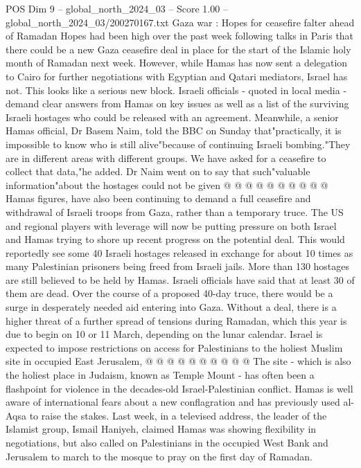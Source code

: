 \begin{textsample}{POS Dim 9 – global\_north\_2024\_03 – Score 1.00 – global\_north\_2024\_03/200270167.txt}  \label{ex:f9_pos_275}
Gaza war : Hopes for ceasefire falter ahead of Ramadan Hopes had been high over the past week following talks in Paris that there could be a new Gaza ceasefire deal in place for the start of the Islamic holy month of Ramadan next week.
However, while Hamas has now sent a delegation to Cairo for further negotiations with Egyptian and Qatari mediators, Israel has not.
This looks like a serious new block.
Israeli officials - quoted in local media - demand clear answers from Hamas on key issues as well as a list of the surviving Israeli hostages who could be released with an agreement.
Meanwhile, a senior Hamas official, Dr Basem Naim, told the BBC on Sunday that"practically, it is impossible to know who is still alive"because of continuing Israeli bombing."They are in different areas with different groups.
We have asked for a ceasefire to collect that data,"he added.
Dr Naim went on to say that such"valuable information"about the hostages could not be given @ @ @ @ @ @ @ @ @ @ Hamas figures, have also been continuing to demand a full ceasefire and withdrawal of Israeli troops from Gaza, rather than a temporary truce.
The US and regional players with leverage will now be putting pressure on both Israel and Hamas trying to shore up recent progress on the potential deal.
This would reportedly see some 40 Israeli hostages released in exchange for about 10 times as many Palestinian prisoners being freed from Israeli jails.
More than 130 hostages are still believed to be held by Hamas.
Israeli officials have said that at least 30 of them are dead.
Over the course of a proposed 40-day truce, there would be a surge in desperately needed aid entering into Gaza.
Without a deal, there is a higher threat of a further spread of tensions during Ramadan, which this year is due to begin on 10 or 11 March, depending on the lunar calendar.
Israel is expected to impose restrictions on access for Palestinians to the holiest Muslim site in occupied East Jerusalem, @ @ @ @ @ @ @ @ @ @ The site - which is also the holiest place in Judaism, known as Temple Mount - has often been a flashpoint for violence in the decades-old Israel-Palestinian conflict.
Hamas is well aware of international fears about a new conflagration and has previously used al-Aqsa to raise the stakes.
Last week, in a televised address, the leader of the Islamist group, Ismail Haniyeh, claimed Hamas was showing flexibility in negotiations, but also called on Palestinians in the occupied West Bank and Jerusalem to march to the mosque to pray on the first day of Ramadan.

\end{textsample}
